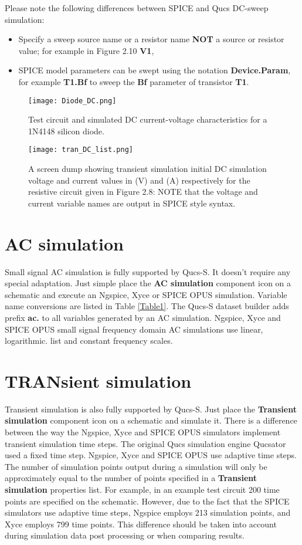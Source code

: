  Please note the following differences between SPICE and Qucs DC-sweep simulation:
\begin{itemize}
	\item {Specify a sweep source name or a resistor name \textbf{NOT} a source or resistor value; for example in Figure 2.10 \textbf{V1}, }
	\item {SPICE model parameters can be swept using the notation \textbf{Device.Param}, for example  \textbf{T1.Bf} to sweep the\textbf{ Bf} parameter of transistor \textbf{T1}. }
\end{itemize}
 \begin{figure}[h]
	\centering
	\texttt{[image: Diode\_DC.png]}
	\caption{Test circuit and simulated DC current-voltage characteristics for a 1N4148 silicon diode.}
	\label{Fig18}
\end{figure}
 \begin{figure}[h]
	\centering
	\texttt{[image: tran\_DC\_list.png]}
	\caption{A screen dump showing transient simulation initial DC simulation voltage and current values in (V) and (A) respectively for the resistive circuit given in Figure 2.8: NOTE that the voltage and current variable names are output in SPICE style syntax.}
	\label{Fig17}
\end{figure}



\section{AC simulation}
Small signal AC simulation is fully supported by Qucs-S. It doesn't require any special adaptation. Just simple place the \textbf{AC simulation} component icon on a  schematic and execute an Ngspice, Xyce or SPICE OPUS simulation. Variable name conversions are listed in Table \ref{Table1}. The Qucs-S dataset builder adds prefix \textbf{ac.} to all variables generated by an AC simulation. Ngspice, Xyce and SPICE OPUS small signal frequency domain AC simulations use linear, logarithmic. list and constant frequency scales.

\section{TRANsient simulation}
Transient simulation is also fully supported by Qucs-S. Just place the \textbf{Transient simulation} component icon on a schematic and simulate it.  There is a difference between the way the Ngspice, Xyce and SPICE OPUS simulators implement transient simulation time steps. The original Qucs simulation engine Qucsator used a fixed time step. Ngspice, Xyce and SPICE OPUS use adaptive time steps. The number of simulation points output during a simulation will only be approximately equal to the number of points specified in a \textbf{Transient simulation} properties list.  For example, in an example test circuit 200 time points are specified on the schematic. However, due to the fact that the SPICE simulators use adaptive time steps, Ngspice employs 213 simulation points, and Xyce employs 799 time points. This difference should be taken into account during simulation data post processing or when comparing results.

